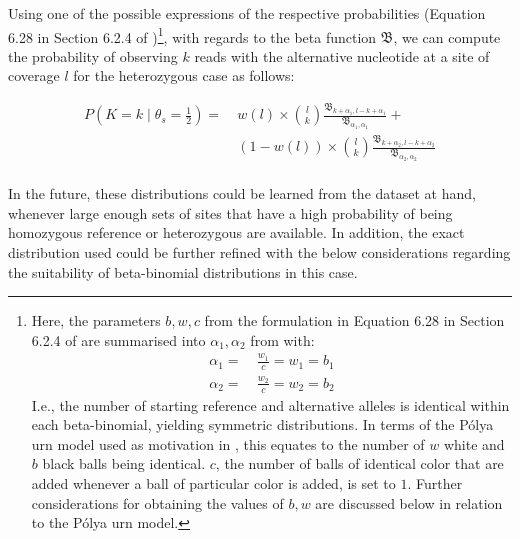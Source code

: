 \documentclass[authoryear,preprint,11pt]{scrartcl}
\newcommand{\Prob}{{P}}
\begin{document}
Using one of the possible expressions of the respective probabilities (Equation 6.28 in Section 6.2.4 of \cite{johnson_univariate_2005})\footnote{
 Here, the parameters $b,w,c$ from the formulation in Equation 6.28 in Section 6.2.4 of \cite{johnson_univariate_2005} are summarised into $\alpha_1,\alpha_2$ from \cite{lodato_somatic_2015} with:
 \begin{equation}
 \label{eq.johnson_relation}
 \begin{split}
  \alpha_1 =~ & \frac{w_1}{c} = w_1 = b_1\\
  \alpha_2 =~ & \frac{w_2}{c} = w_2 = b_2
 \end{split}
 \end{equation}
 I.e., the number of starting reference and alternative alleles is identical within each beta-binomial, yielding symmetric distributions.
 In terms of the Pólya urn model used as motivation in \cite{johnson_univariate_2005}, this equates to the number of $w$ white and $b$ black balls being identical.
 $c$, the number of balls of identical color that are added whenever a ball of particular color is added, is set to $1$.
 Further considerations for obtaining the values of $b,w$ are discussed below in relation to the Pólya urn model.
}, with regards to the beta function $\mathfrak{B}$, we can compute the probability of observing $k$ reads with the alternative nucleotide at a site of coverage $l$ for the heterozygous case as follows:

\begin{equation}
 \label{eq.beta-binomial}
 \begin{split}
  \Prob(K = k \mid \theta_s = \frac{1}{2}) =~ &w(l) \times {l \choose k} \frac{ \mathfrak{B}_{k+\alpha_1,l-k+\alpha_1} }{ \mathfrak{B}_{\alpha_1,\alpha_1} } +\\
  &(1-w(l)) \times {l \choose k} \frac{ \mathfrak{B}_{k+\alpha_2,l-k+\alpha_2} }{ \mathfrak{B}_{\alpha_2,\alpha_2} }\\
 \end{split}
\end{equation}

In the future, these distributions could be learned from the dataset at hand, whenever large enough sets of sites that have a high probability of being homozygous reference or heterozygous are available.
In addition, the exact distribution used could be further refined with the below considerations regarding the suitability of beta-binomial distributions in this case.\\
\end{document}
